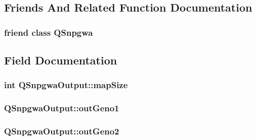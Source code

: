 \subsection{Friends And Related Function Documentation}
\hypertarget{classQSnpgwaOutput_a7db91fc2b62ffb71edee988fd8f7f575}{
\subsubsection[{QSnpgwa}]{\setlength{\rightskip}{0pt plus 5cm}friend class {\bf QSnpgwa}}}
\label{classQSnpgwaOutput_a7db91fc2b62ffb71edee988fd8f7f575}


\subsection{Field Documentation}
\hypertarget{classQSnpgwaOutput_afd9b23c1ded591a794688c9ebb58103b}{
\subsubsection[{mapSize}]{\setlength{\rightskip}{0pt plus 5cm}int {\bf QSnpgwaOutput::mapSize}}}
\label{classQSnpgwaOutput_afd9b23c1ded591a794688c9ebb58103b}
\hypertarget{classQSnpgwaOutput_a13210554d75274ea4e2fd14480e6144b}{
\subsubsection[{outGeno1}]{ {\bf QSnpgwaOutput::outGeno1}}}
\label{classQSnpgwaOutput_a13210554d75274ea4e2fd14480e6144b}
\hypertarget{classQSnpgwaOutput_a94e142191f1b20e3ea9ed7d5619d6537}{
\subsubsection[{outGeno2}]{ {\bf QSnpgwaOutput::outGeno2}}}
